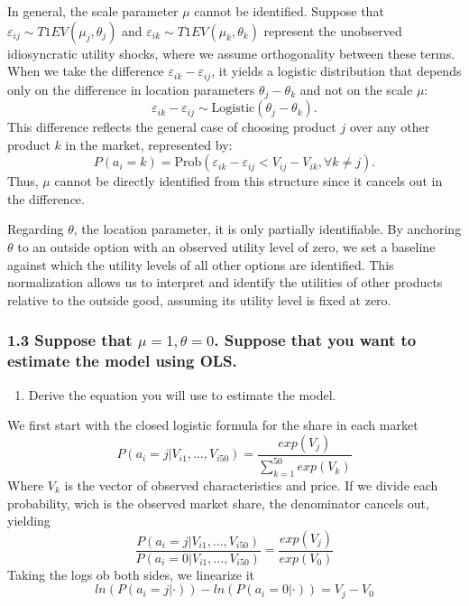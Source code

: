 \documentclass[
]{article}
\providecommand{\tightlist}{%
  \setlength{\itemsep}{0pt}\setlength{\parskip}{0pt}}
\begin{document}
In general, the scale parameter \(\mu\) cannot be identified. Suppose
that \(\varepsilon_{ij} \sim T1EV(\mu_j, \theta_j)\) and
\(\varepsilon_{ik} \sim T1EV(\mu_k, \theta_k)\) represent the unobserved
idiosyncratic utility shocks, where we assume orthogonality between
these terms. When we take the difference
\(\varepsilon_{ik} - \varepsilon_{ij}\), it yields a logistic
distribution that depends only on the difference in location parameters
\(\theta_j - \theta_k\) and not on the scale \(\mu\): \[
\varepsilon_{ik} - \varepsilon_{ij} \sim \text{Logistic}(\theta_j - \theta_k).
\] This difference reflects the general case of choosing product \(j\)
over any other product \(k\) in the market, represented by: \[
P(a_i = k) = \text{Prob}\left(\varepsilon_{ik} - \varepsilon_{ij} < V_{ij} - V_{ik}, \forall k \neq j\right).
\] Thus, \(\mu\) cannot be directly identified from this structure since
it cancels out in the difference.

Regarding \(\theta\), the location parameter, it is only partially
identifiable. By anchoring \(\theta\) to an outside option with an
observed utility level of zero, we set a baseline against which the
utility levels of all other options are identified. This normalization
allows us to interpret and identify the utilities of other products
relative to the outside good, assuming its utility level is fixed at
zero.

\subsubsection{\texorpdfstring{1.3 Suppose that \(\mu = 1, \theta = 0\).
Suppose that you want to estimate the model using
OLS.}{1.3 Suppose that \textbackslash mu = 1, \textbackslash theta = 0. Suppose that you want to estimate the model using OLS.}}\label{suppose-that-mu-1-theta-0.-suppose-that-you-want-to-estimate-the-model-using-ols.}

\begin{enumerate}
\def\labelenumi{\alph{enumi})}
\tightlist
\item
  Derive the equation you will use to estimate the model.
\end{enumerate}

We first start with the closed logistic formula for the share in each
market \[
P(a_i=j|V_{i1},\dots,  V_{i50}) = \frac{exp(V_j)}{\sum_{k=1}^{50}exp(V_k)}
\] Where \(V_k\) is the vector of observed characteristics and price. If
we divide each probability, wich is the observed market share, the
denominator cancels out, yielding \[
\frac{P(a_i=j|V_{i1},\dots,  V_{i50})}{P(a_i=0|V_{i1},\dots,  V_{i50})} = \frac{exp(V_j)}{exp(V_0)}
\] Taking the logs ob both sides, we linearize it \[
ln(P(a_i=j|\cdot))-ln(P(a_i=0|\cdot))= V_j-V_0
\]
\end{document}
